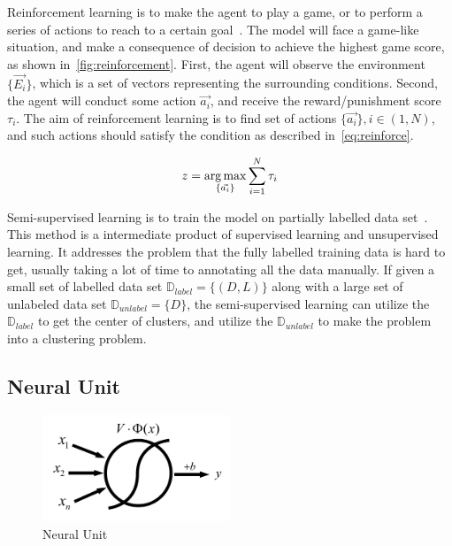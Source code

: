 \begin{spacing}{1.5}
Reinforcement learning is to make the agent to play a game, or to perform a series of actions to reach to a certain goal~\cite{barto2004reinforcement}. The model will face a game-like situation, and make a consequence of decision to achieve the highest game score, as shown in~\autoref{fig:reinforcement}. First, the agent will observe the environment $\{\vec{E_i}\}$, which is a set of vectors representing the surrounding conditions. Second, the agent will conduct some action $\vec{a_i}$, and receive the reward/punishment score $\tau_i$. The aim of reinforcement learning is to find set of actions $\{\vec{a_i}\}, i \in (1,N)$, and such actions should satisfy the condition as described in~\autoref{eq:reinforce}.

\begin{equation}
\label{eq:reinforce}
   z = \operatorname*{arg\,max}_{\{\vec{a_i}\}} \sum_{i=1}^{N} \tau_i
\end{equation}

Semi-supervised learning is to train the model on partially labelled data set~\cite{zhu2009introduction, zhu2005semi}. This method is a intermediate product of supervised learning and unsupervised learning. It addresses the problem that the fully labelled training data is hard to get, usually taking a lot of time to annotating all the data manually. If given a small set of labelled data set $\mathbb{D}_{label} = \{(D,L)\}$ along with a large set of unlabeled data set $\mathbb{D}_{unlabel} = \{D\}$, the semi-supervised learning can utilize the $\mathbb{D}_{label}$ to get the center of clusters, and utilize the $\mathbb{D}_{unlabel}$ to make the problem into a clustering problem.

\subsection{Neural Unit}
\label{subsec:neural_unit}

\begin{figure}[ht]
\centering
\includegraphics[width=0.5\textwidth, fbox]{Chapter2/neuralunit.pdf}
\caption{Neural Unit}
\label{fig:neuralunit} 
\end{figure}


\end{spacing}
